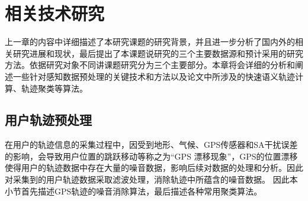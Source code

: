 \chapter{相关技术研究}
\label{chap:chapter02}
上一章的内容中详细描述了本研究课题的研究背景，并且进一步分析了国内外的相关研究进展和现状，最后提出了本课题说研究的三个主要数据源和预计采用的研究方法。依据研究对象不同讲课题研究分为三个主要部分。本章将会详细的分析和阐述一些针对感知数据预处理的关键技术和方法以及论文中所涉及的快速语义轨迹计算、轨迹聚类等算法。
\section{用户轨迹预处理}
\label{sec:section2-1}
在用户的轨迹信息的采集过程中，因受到地形、气候、GPS传感器和SA干扰误差的影响，会导致用户位置的跳跃移动等称之为“GPS 漂移现象”，GPS的位置漂移使得用户的轨迹数据中存在大量的噪音数据，影响后续对数据的处理和分析。因此对采集到的用户轨迹数据采取滤波处理，消除轨迹中所蕴含的噪音数据。%
因此本小节首先描述GPS轨迹的噪音消除算法，最后描述各种常用聚类算法。
